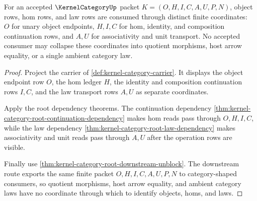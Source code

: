\begin{theorem}
\label{thm:kernel-category-object-hom-law-separation}
For an accepted $\KernelCategoryUp$ packet $K=(O,H,I,C,A,U,P,N)$, object rows, hom rows, and law rows are consumed through distinct finite coordinates: $O$ for unary object endpoints, $H,I,C$ for hom, identity, and composition continuation rows, and $A,U$ for associativity and unit transport. No accepted consumer may collapse these coordinates into quotient morphisms, host arrow equality, or a single ambient category law.
\end{theorem}
\begin{proof}
Project the carrier of \autoref{def:kernel-category-carrier}. It displays the object endpoint row $O$, the hom ledger $H$, the identity and composition continuation rows $I,C$, and the law transport rows $A,U$ as separate coordinates.

Apply the root dependency theorems. The continuation dependency \autoref{thm:kernel-category-root-continuation-dependency} makes hom reads pass through $O,H,I,C$, while the law dependency \autoref{thm:kernel-category-root-law-dependency} makes associativity and unit reads pass through $A,U$ after the operation rows are visible.

Finally use \autoref{thm:kernel-category-root-downstream-unblock}. The downstream route exports the same finite packet $O,H,I,C,A,U,P,N$ to category-shaped consumers, so quotient morphisms, host arrow equality, and ambient category laws have no coordinate through which to identify objects, homs, and laws.
\end{proof}
